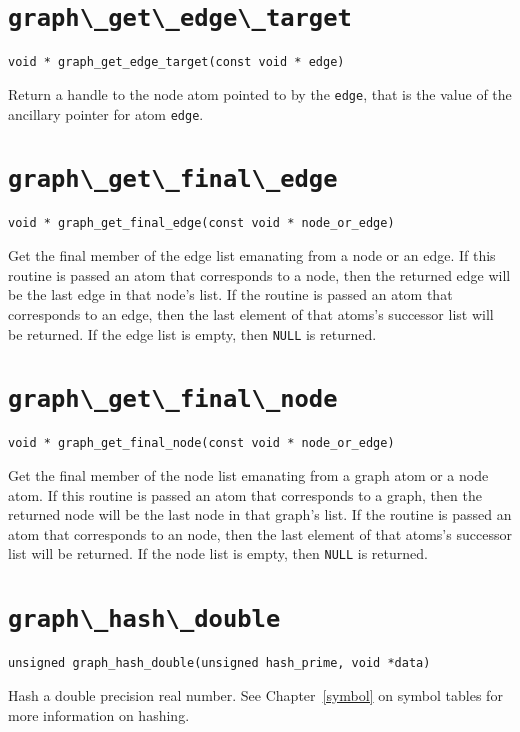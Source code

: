 \section{\protect\verb+graph\_get\_edge\_target+}
\begin{verbatim}
void * graph_get_edge_target(const void * edge)
\end{verbatim}
Return a handle to the node atom pointed to by the {\tt edge}, that is the value of the
ancillary pointer for atom {\tt edge}.

\section{\protect\verb+graph\_get\_final\_edge+}
\begin{verbatim}
void * graph_get_final_edge(const void * node_or_edge) 
\end{verbatim}
Get the final member of the edge list emanating from a node or an edge.
If this routine is passed an atom that corresponds to a node, then the
returned edge will be the last edge in that node's list. If the routine
is passed an atom that corresponds to an edge, then the last element of that
atoms's successor list will be returned. If the edge list is empty, then {\tt NULL} is
returned.

\section{\protect\verb+graph\_get\_final\_node+}
\begin{verbatim}
void * graph_get_final_node(const void * node_or_edge) 
\end{verbatim}
Get the final member of the node list emanating from a graph atom or a node atom.
If this routine is passed an atom that corresponds to a graph, then the
returned node will be the last node in that graph's list. If the routine
is passed an atom that corresponds to an node, then the last element of that
atoms's successor list will be returned. If the node list is empty, then {\tt NULL} is
returned.

\section{\protect\verb+graph\_hash\_double+}
\begin{verbatim}
unsigned graph_hash_double(unsigned hash_prime, void *data)
\end{verbatim}
Hash a double precision real number. See Chapter~\ref{symbol} on symbol tables for more
information on hashing.

